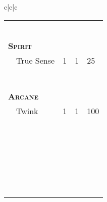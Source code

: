 \documentclass{article}
\begin{document}
\begin{tabular}{c|c|c}
\begin{tabular}{p{1.4in}|p{.2in}|p{.2in}|p{.2in}}
    \hline
    & & & \\
    \hline
    & & & \\
    \hline
    & & & \\
    \hline
    & & & \\
    \hline
    & & & \\
    \hline
    & & & \\
    \hline
    & & & \\
    \hline
    \hline
    \hline
    \textsc{\textbf{Spirit}} & & & \\
    \hline
    ~~True Sense & 1 & 1 & 25 \\
    \hline
    & & & \\
    \hline
    & & & \\
    \hline
    & & & \\
    \hline
    & & & \\
    \hline
    & & & \\
    \hline
    & & & \\
    \hline
    & & & \\
    \hline
    \hline
    \hline
    \textsc{\textbf{Arcane}} & & & \\
    \hline
    ~~Twink & 1 & 1 & 100 \\
    \hline
    & & & \\
    \hline
    & & & \\
    \hline
    & & & \\
    \hline
    & & & \\
    \hline
    & & & \\
    \hline
    & & & \\
    \hline
    & & & \\
    \hline
    & & & \\
    \hline
    & & & \\
    \hline
    & & & \\
    \hline
    & & & \\
    \hline
    & & & \\
    \hline
    & & & \\
    \hline
    & & & \\
    \hline
    & & & \\
    \hline
    & & & \\
    \hline
    & & & \\
    \hline
    & & & \\
    \hline
    & & & \\
    \hline
    & & & \\
    \hline
    & & & \\
    \hline
    & & & \\
    \hline
    & & & \\
    \hline
    & & & \\
    \hline
    & & & \\
    \hline
    & & & \\
  \end{tabular} \\
\end{tabular}
\end{document}
